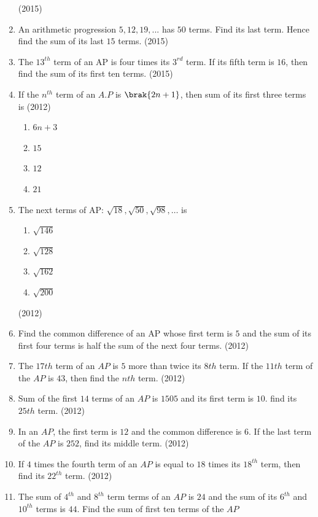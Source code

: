 \begin{enumerate}[label=\thesubsection.\arabic*,ref=\thesubsection.\theenumi,itemsep=1pt]
\hfill(2015)
 \item An arithmetic progression $5, 12, 19, ...$ has $50$ terms. Find its last term. Hence find the sum of its last $15$ terms.
%
\hfill(2015) \item The $13^{th}$ term of an AP is four times its $3^{rd}$ term. If its fifth term is $16$, then find the sum of its first ten terms.
\hfill(2015)
 \item If the $n^{th}$ term of an $A.P$ is $\brak{2n+1}$, then sum of its first three terms is 
\hfill(2012)
\begin{multicols}{4}
\begin{enumerate}
 \item $6n + 3$ 
 \item $15$ 
 \item $12$ 
 \item $21$ 
\end{enumerate}
\end{multicols}
 \item The next terms of AP: $\sqrt {18}, \sqrt {50}, \sqrt {98}, \dots$ is 
\begin{multicols}{4}
\begin{enumerate}
 \item $\sqrt {146}$ 
 \item $\sqrt {128}$ 
 \item $\sqrt {162}$ 
 \item $\sqrt {200}$ 
\end{enumerate}
\end{multicols}
\hfill(2012) \item Find the common difference of an AP whose first term is $5$ and the sum of its first four terms is half the sum of the next four terms. 
\hfill(2012) \item The $17th$ term of an $AP$ is $5$ more than twice its $8th$ term. If the $11th$ term of the $AP$ is $43$, then find the $nth$ term. 
%
\hfill(2012) \item Sum of the first $14$ terms of an $AP$ is $1505$ and its first term is $10$. find its $25th$ term. 
\hfill(2012) \item In an $AP$, the first term is $12$ and the common difference is $6$. If the last term of the $AP$ is $252$, find its middle term. 
\hfill(2012) \item If $4$ times the fourth term of an $AP$ is equal to $18$ times its $18^{th}$ term, then find its $22^{th}$ term. 
\hfill(2012) \item The sum of $4^{th}$ and $8^{th}$ term terms of an $AP$ is $24$ and the sum of its $6^{th}$ and $10^{th}$ terms is $44$. Find the sum of first ten terms of the $AP$ 

\end{enumerate}
